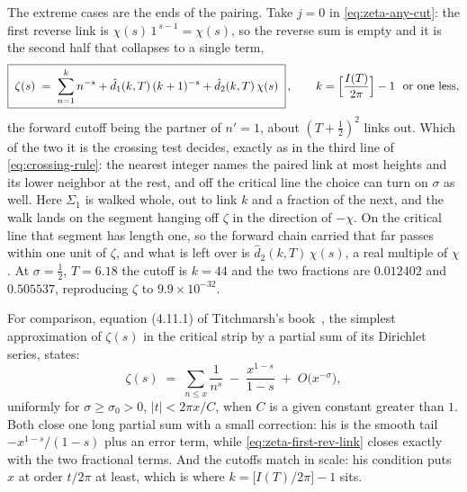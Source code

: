 \documentclass[11pt]{article}
\theoremstyle{definition}
\begin{document}
The extreme cases are the ends of the pairing. Take $j=0$ in
\eqref{eq:zeta-any-cut}: the first reverse link is
$\chi(s)\,1^{\,s-1}=\chi(s)$, so the reverse sum is empty and it is the second
half that collapses to a single term,
\begin{equation}\label{eq:zeta-first-rev-link}
\boxed{\;
\zeta(s)
\;=\;
\sum_{n=1}^{k}n^{-s}+\hat d_1(k,T)\,(k+1)^{-s}+\hat d_2(k,T)\,\chi(s)
\;}\,,
\qquad k=\Bigl[\frac{I(T)}{2\pi}\Bigr]-1\ \text{ or one less},
\end{equation}
the forward cutoff being the partner of $n'=1$, about $(T+\tfrac12)^{2}$
links out. Which of the two it is the crossing test decides, exactly as in the
third line of \eqref{eq:crossing-rule}: the nearest integer names the paired
link at most heights and its lower neighbor at the rest, and off the critical
line the choice can turn on $\sigma$ as well. Here $\Sigma_1$ is walked whole, out to link $k$ and a fraction of the next, and the walk
lands on the segment hanging off $\zeta$ in the direction of $-\chi$. On the
critical line that segment has length one, so the forward chain carried that
far passes within one unit of $\zeta$, and what is left over is
$\hat d_2(k,T)\,\chi(s)$, a real multiple of $\chi$. At $\sigma=\tfrac12$,
$T=6.18$ the cutoff is $k=44$ and the two fractions are $0.012402$ and
$0.505537$, reproducing $\zeta$ to $9.9\times10^{-32}$.

For comparison, equation (4.11.1) of Titchmarsh's
book~\cite[\S4.11]{Titchmarsh1986}, the simplest approximation of
$\zeta(s)$ in the critical strip by a partial sum of its Dirichlet
series, states:
\begin{equation}\label{eq:titchmarsh-partial-sum}
\zeta(s)\;=\;\sum_{n\le x}\frac{1}{n^{s}}
\;-\;\frac{x^{1-s}}{1-s}
\;+\;O\bigl(x^{-\sigma}\bigr),
\end{equation}
uniformly for $\sigma\ge\sigma_0>0$, $|t|<2\pi x/C$, when $C$ is a given
constant greater than $1$. Both close one long partial sum with a small
correction: his is the smooth tail $-x^{1-s}/(1-s)$ plus an error term,
while \eqref{eq:zeta-first-rev-link} closes exactly with the two
fractional terms. And the cutoffs match in scale: his condition puts $x$
at order $t/2\pi$ at least, which is where
$k=\bigl[I(T)/2\pi\bigr]-1$ sits.
\end{document}
